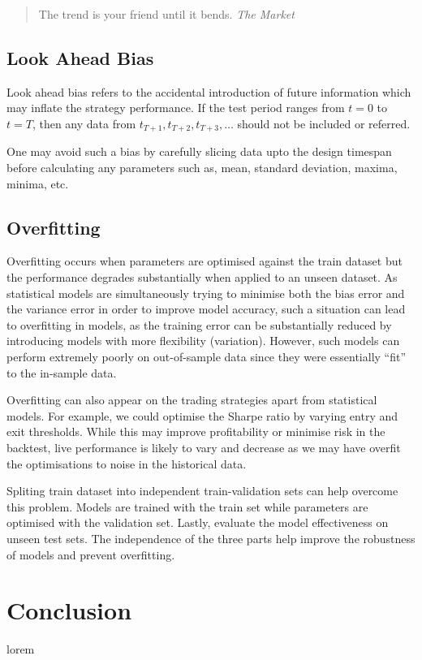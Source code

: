 \documentclass[12pt]{article}
\begin{document}
\begin{quote}
  The trend is your friend until it bends.
  \textit{The Market}
\end{quote}

\subsection{Look Ahead Bias}

Look ahead bias refers to the accidental introduction of future information which may inflate the strategy performance. If the test period ranges from $t=0$ to $t=T$, then any data from $t_{T+1}, t_{T+2}, t_{T+3}, \dots$ should not be included or referred.

One may avoid such a bias by carefully slicing data upto the design timespan before calculating any parameters such as, mean, standard deviation, maxima, minima, etc.

\subsection{Overfitting}

Overfitting occurs when parameters are optimised against the train dataset but the performance degrades substantially when applied to an unseen dataset. As statistical models are simultaneously trying to minimise both the bias error and the variance error in order to improve model accuracy, such a situation can lead to overfitting in models, as the training error can be substantially reduced by introducing models with more flexibility (variation). However, such models can perform extremely poorly on out-of-sample data since they were essentially “fit” to the in-sample data.

Overfitting can also appear on the trading strategies apart from statistical models. For example, we could optimise the Sharpe ratio by varying entry and exit thresholds. While this may improve profitability or minimise risk in the backtest, live performance is likely to vary and decrease as we may have overfit the optimisations to noise in the historical data.

Spliting train dataset into independent train-validation sets can help overcome this problem. Models are trained with the train set while parameters are optimised with the validation set. Lastly, evaluate the model effectiveness on unseen test sets. The independence of the three parts help improve the robustness of models and prevent overfitting.

\section*{Conclusion}

lorem

\renewcommand{\refname}{Reference} %
\printbibliography
\end{document}
